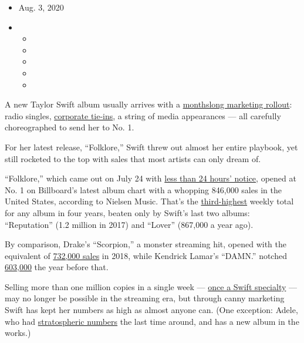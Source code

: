 \begin{itemize}
\item
  Aug. 3, 2020
\item
  \begin{itemize}
  \item
  \item
  \item
  \item
  \item
  \end{itemize}
\end{itemize}

A new Taylor Swift album usually arrives with a
\href{https://www.nytimes.com/2014/08/19/business/media/taylor-swift-maximizes-use-of-social-media-in-release-of-new-album.html}{monthslong
marketing rollout}: radio singles,
\href{https://artsbeat.blogs.nytimes.com/2012/10/30/swifts-red-tops-a-million-sales-in-week-1/}{corporate
tie-ins}, a string of media appearances --- all carefully choreographed
to send her to No. 1.

For her latest release, ``Folklore,'' Swift threw out almost her entire
playbook, yet still rocketed to the top with sales that most artists can
only dream of.

``Folklore,'' which came out on July 24 with
\href{https://www.nytimes.com/2020/07/23/arts/music/taylor-swift-kanye-west.html}{less
than 24 hours' notice}, opened at No. 1 on Billboard's latest album
chart with a whopping 846,000 sales in the United States, according to
Nielsen Music. That's the
\href{https://www.billboard.com/articles/business/chart-beat/9428290/taylor-swift-folklore-billboard-200-number-1}{third-highest}
weekly total for any album in four years, beaten only by Swift's last
two albums: ``Reputation'' (1.2 million in 2017) and ``Lover'' (867,000
a year ago).

By comparison, Drake's ``Scorpion,'' a monster streaming hit, opened
with the equivalent of
\href{https://www.billboard.com/articles/columns/chart-beat/8464342/drake-scorpion-debut-no1-billboard-200-chart-sets-streaming-record}{732,000
sales} in 2018, while Kendrick Lamar's ``DAMN.'' notched
\href{https://www.nytimes.com/2017/04/24/arts/music/kendrick-lamar-damn-billboard-debut.html}{603,000}
the year before that.

Selling more than one million copies in a single week ---
\href{https://www.nytimes.com/2019/09/02/arts/music/taylor-swift-lover-sales.html}{once
a Swift specialty} --- may no longer be possible in the streaming era,
but through canny marketing Swift has kept her numbers as high as almost
anyone can. (One exception: Adele, who had
\href{https://www.nytimes.com/2015/11/28/business/media/adele-shatters-music-industry-truisms-by-going-against-the-grain.html}{stratospheric
numbers} the last time around, and has a new album in the works.)

